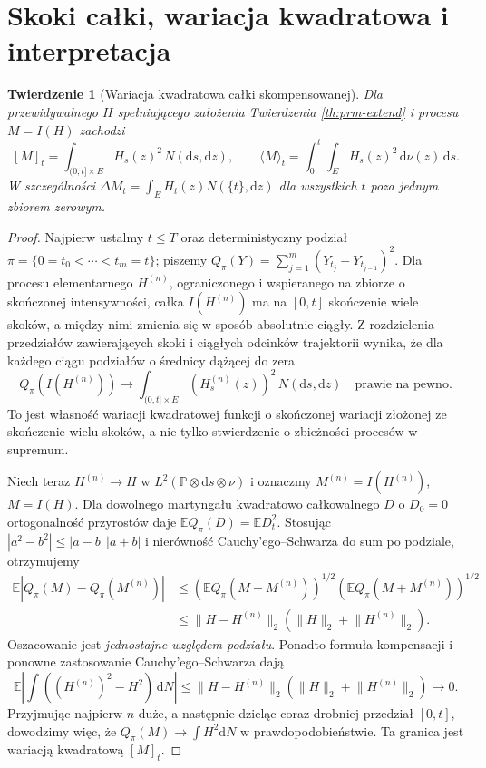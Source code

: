 \documentclass[11pt,a4paper,oneside]{report}
\numberwithin{equation}{chapter}
\theoremstyle{plain}
\newtheorem{twierdzenie}{Twierdzenie}[chapter]
\theoremstyle{definition}
\theoremstyle{remark}
\newcommand{\Prob}{\mathbb{P}}
\newcommand{\E}{\mathbb{E}}
\newcommand{\dd}{\mathrm{d}}
\newcommand{\norm}[1]{\lVert #1\rVert}
\begin{document}
\section{Skoki całki, wariacja kwadratowa i interpretacja}

\begin{twierdzenie}[Wariacja kwadratowa całki skompensowanej]
\label{th:prm-bracket}
Dla przewidywalnego $H$ spełniającego założenia
Twierdzenia \ref{th:prm-extend} i procesu $M=I(H)$ zachodzi
\[
[M]_t=\int_{(0,t]\times E}H_s(z)^2\,N(\dd s,\dd z),
\qquad
\langle M\rangle_t=\int_0^t\int_EH_s(z)^2\,\dd\nu(z)\,\dd s.
\tag{11.3}\label{eq:prm-brackets}
\]
W szczególności $\Delta M_t=\int_EH_t(z)N(\{t\},\dd z)$
dla wszystkich $t$ poza jednym zbiorem zerowym.
\end{twierdzenie}
\begin{proof}
Najpierw ustalmy $t\le T$ oraz deterministyczny podział
$\pi=\{0=t_0<\cdots<t_m=t\}$; piszemy
$Q_\pi(Y)=\sum_{j=1}^m(Y_{t_j}-Y_{t_{j-1}})^2$.
Dla procesu elementarnego $H^{(n)}$, ograniczonego i
wspieranego na zbiorze o skończonej intensywności, całka
$I(H^{(n)})$ ma na $[0,t]$ skończenie wiele skoków, a między
nimi zmienia się w sposób absolutnie ciągły. Z rozdzielenia
przedziałów zawierających skoki i ciągłych odcinków trajektorii
wynika, że dla każdego ciągu podziałów o średnicy dążącej do zera
\[
 Q_\pi(I(H^{(n)}))\longrightarrow
 \int_{(0,t]\times E}(H_s^{(n)}(z))^2\,N(\dd s,\dd z)
 \quad\text{prawie na pewno}.
\]
To jest własność wariacji kwadratowej funkcji o skończonej
wariacji złożonej ze skończenie wielu skoków, a nie tylko
stwierdzenie o zbieżności procesów w supremum.

Niech teraz $H^{(n)}\to H$ w
$L^2(\Prob\otimes\dd s\otimes\nu)$ i oznaczmy
$M^{(n)}=I(H^{(n)})$, $M=I(H)$. Dla dowolnego martyngału
kwadratowo całkowalnego $D$ o $D_0=0$ ortogonalność
przyrostów daje
$\E Q_\pi(D)=\E D_t^2$. Stosując
$|a^2-b^2|\le |a-b|\,|a+b|$ i nierówność
Cauchy'ego--Schwarza do sum po podziale, otrzymujemy
\[
\begin{split}
\E|Q_\pi(M)-Q_\pi(M^{(n)})|
&\le (\E Q_\pi(M-M^{(n)}))^{1/2}
      (\E Q_\pi(M+M^{(n)}))^{1/2}\\
&\le \norm{H-H^{(n)}}_2
      (\norm H_2+\norm{H^{(n)}}_2).
\end{split}
\]
Oszacowanie jest \emph{jednostajne względem podziału}.
Ponadto formuła kompensacji i ponowne zastosowanie
Cauchy'ego--Schwarza dają
\[
\E\left|\int ((H^{(n)})^2-H^2)\,\dd N\right|
\le\norm{H-H^{(n)}}_2
  (\norm H_2+\norm{H^{(n)}}_2)\longrightarrow0.
\]
Przyjmując najpierw $n$ duże, a następnie dzieląc coraz
drobniej przedział $[0,t]$, dowodzimy więc, że
$Q_\pi(M)\to\int H^2\dd N$ w prawdopodobieństwie.
Ta granica jest wariacją kwadratową $[M]_t$.


\end{proof}
\end{document}
